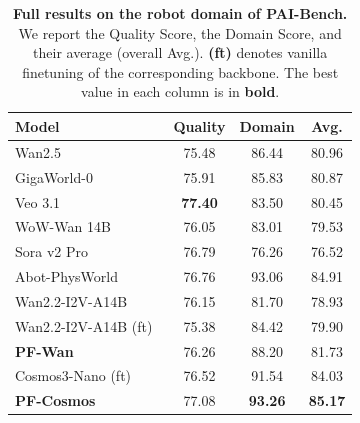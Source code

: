 \documentclass{llmxive}
\providecommand{\arraystretch}{1.15}
\begin{document}
\begin{table}[t]
\centering
\renewcommand{\arraystretch}{1.15}
\setlength{\tabcolsep}{10pt}
\begin{tabular}{l ccc}
\toprule
\textbf{Model} & \textbf{Quality} & \textbf{Domain} & \textbf{Avg.} \\
\midrule
Wan2.5~\cite{wan2025wan}            & 75.48 & 86.44 & 80.96 \\
GigaWorld-0~\cite{team2025gigaworld} & 75.91 & 85.83 & 80.87 \\
Veo 3.1~\cite{GoogleDeepMind2025Veo3} & \textbf{77.40} & 83.50 & 80.45 \\
WoW-Wan 14B~\cite{chi2025wow}        & 76.05 & 83.01 & 79.53 \\
Sora v2 Pro~\cite{openai2025sora2}   & 76.79 & 76.26 & 76.52 \\
Abot-PhysWorld~\cite{ali2025abot}    & 76.76 & 93.06 & 84.91 \\
Wan2.2-I2V-A14B~\cite{wan2025wan}        & 76.15 & 81.70 & 78.93 \\
\midrule
Wan2.2-I2V-A14B (ft)~\cite{wan2025wan}   & 75.38 & 84.42 & 79.90 \\
\quad \textbf{PF-Wan}                & 76.26 & 88.20 & 81.73 \\
Cosmos3-Nano (ft)                    & 76.52 & 91.54 & 84.03 \\
\quad \textbf{PF-Cosmos}             & 77.08 & \textbf{93.26} & \textbf{85.17} \\
\bottomrule
\end{tabular}
\caption{\textbf{Full results on the robot domain of PAI-Bench.} We report the Quality Score, the Domain Score, and their average (overall Avg.). \textbf{(ft)} denotes vanilla finetuning of the corresponding backbone. The best value in each column is in \textbf{bold}.}
\label{tab:paibench_full}
\end{table}
\end{document}

